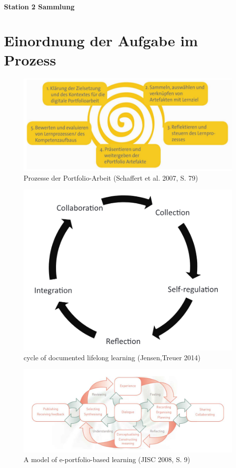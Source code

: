 \documentclass[a4paper,oneside]{scrarticle}
\begin{document}
	\pagestyle{fancy}
	\fancyhead{} %
	\fancyfoot{} %
	\begin{center}
		\begin{LARGE}
			\textbf{Station 2 Sammlung}
		\end{LARGE}
	\end{center}
	
	\section*{Einordnung der Aufgabe im Prozess}
	\begin{figure} [h]
		\centering
		\includegraphics[width=0.7\linewidth]{e-portfolio-prozesse-schaffert}
		\caption{Prozesse der Portfolio-Arbeit (Schaffert et al. 2007, S. 79)\cite{schaffert_e-portfolio-einsatz_2007}}
		\label{fig:e-portfolio-prozesse-schaffert}
	\end{figure}
	\begin{figure}[h]
		\centering
		\includegraphics[width=0.5\linewidth]{cycle-of-documented-lifelong-learning-Jensen}
		\caption{cycle of documented lifelong learning (Jensen,Treuer 2014)\cite{jenson_defining_2014}}
		\label{fig:cycle-of-documented-lifelong-learning-jensen}
	\end{figure}
	\begin{figure}[h]
		\centering
		\includegraphics[width=0.8\linewidth]{model-of-e-portfolio-based-learning}
		\caption{A model of e-portfolio-based learning (JISC 2008, S. 9) \cite{jisc_effective_2008}}
		\label{fig:model-of-e-portfolio-based-learning}
	\end{figure}
	
\end{document}
